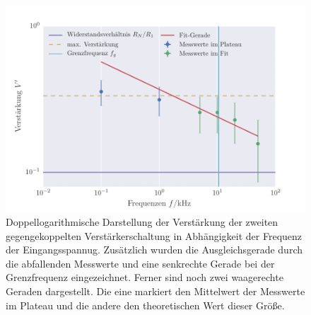 \FloatBarrier
\begin{figure}[!h]
\centering
\includegraphics[scale=1]{../Grafiken/Gegengekoppelter_Verstaerker_2.pdf}
\caption{Doppellogarithmische Darstellung der Verstärkung der zweiten gegengekoppelten Verstärkerschaltung in Abhängigkeit der Frequenz der Eingangsspannug. Zusätzlich wurden die Ausgleichsgerade
	durch die abfallenden Messwerte und eine senkrechte Gerade bei der Grenzfrequenz eingezeichnet. Ferner sind noch  zwei waagerechte Geraden dargestellt. Die eine markiert den Mittelwert der Messwerte im Plateau und die  andere
	den theoretischen Wert dieser Größe.\label{fig:gegengekoppelter_verstaerker_2}}
\end{figure}
\FloatBarrier